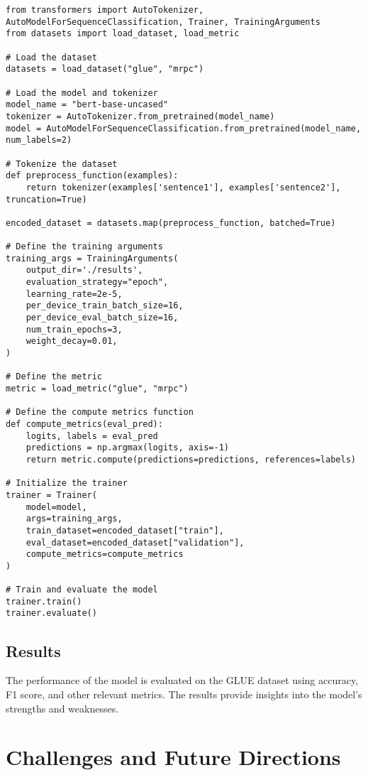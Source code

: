 \begin{verbatim}
from transformers import AutoTokenizer, AutoModelForSequenceClassification, Trainer, TrainingArguments
from datasets import load_dataset, load_metric

# Load the dataset
datasets = load_dataset("glue", "mrpc")

# Load the model and tokenizer
model_name = "bert-base-uncased"
tokenizer = AutoTokenizer.from_pretrained(model_name)
model = AutoModelForSequenceClassification.from_pretrained(model_name, num_labels=2)

# Tokenize the dataset
def preprocess_function(examples):
    return tokenizer(examples['sentence1'], examples['sentence2'], truncation=True)

encoded_dataset = datasets.map(preprocess_function, batched=True)

# Define the training arguments
training_args = TrainingArguments(
    output_dir='./results',
    evaluation_strategy="epoch",
    learning_rate=2e-5,
    per_device_train_batch_size=16,
    per_device_eval_batch_size=16,
    num_train_epochs=3,
    weight_decay=0.01,
)

# Define the metric
metric = load_metric("glue", "mrpc")

# Define the compute metrics function
def compute_metrics(eval_pred):
    logits, labels = eval_pred
    predictions = np.argmax(logits, axis=-1)
    return metric.compute(predictions=predictions, references=labels)

# Initialize the trainer
trainer = Trainer(
    model=model,
    args=training_args,
    train_dataset=encoded_dataset["train"],
    eval_dataset=encoded_dataset["validation"],
    compute_metrics=compute_metrics
)

# Train and evaluate the model
trainer.train()
trainer.evaluate()
\end{verbatim}

\subsection{Results}
The performance of the model is evaluated on the GLUE dataset using accuracy, F1 score, and other relevant metrics. The results provide insights into the model's strengths and weaknesses.

\section{Challenges and Future Directions}

